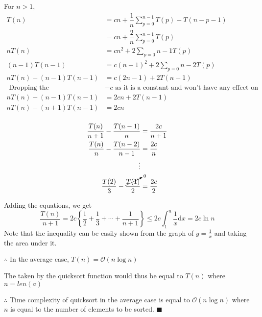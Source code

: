 \documentclass[answers]{exam}
\renewcommand{\O}[1]{\mathcal{O}\left(#1\right)}
\begin{document}
\begin{questions}
\begin{solution}
            For \(n > 1\),
            \begin{equation*}
                \begin{aligned}
                    T(n) &= cn + \dfrac{1}{n}\sum_{p=0}^{n-1}{T(p) + T(n - p - 1)} \\
                         &= cn + \dfrac{2}{n}\sum_{p=0}^{n-1}{T(p)} \\    
                    nT(n) &= cn^2 + 2\sum_{p=0}{n - 1}{T(p)} \\
                    (n - 1)T(n - 1) &= c(n - 1)^2 + 2\sum_{p=0}{n - 2}{T(p)} \\
                    nT(n) - (n-1)T(n-1) &= c(2n - 1) + 2T(n - 1) \\
                    \text{ Dropping the } &-c \text{ as it is a constant and won't have any effect on the order} \\   
                    nT(n) - (n-1)T(n-1) &= 2cn + 2T(n - 1) \\
                    nT(n) - (n + 1)T(n - 1) &= 2cn \\
                \end{aligned}
            \end{equation*}

            \begin{equation*}
                \begin{aligned}
                    \frac{T(n)}{n+1} - \frac{T(n-1)}{n} &= \frac{2c}{n + 1} \\
                    \frac{T(n)}{n} - \frac{T(n-2)}{n-1} &= \frac{2c}{n} \\
                    \vdots \\
                    \frac{T(2)}{3} - \frac{\cancelto{0}{T(1)}}{2} &= \frac{2c}{2} \\
                \end{aligned}
            \end{equation*}

            Adding the equations, we get
            \[\frac{T(n)}{n + 1} = 2c\left\{\frac{1}{2} + \frac{1}{3} + \cdots + \frac{1}{n + 1}\right\}
                \leq 2c\int_{1}^{n}{\frac{1}{x} \text{d}x} = 2c\ln{n}
            \]
            Note that the inequality can be easily shown from the graph of \(y = \frac{1}{x}\) and
            taking the area under it.

            \(\therefore\) In the average case, \(T(n) = \O{n \log{n}}\)

            The taken by the quicksort function would thus be equal to \(T(n)\)
            where \(n = len(a)\)

            \(\therefore\) Time complexity of quicksort in the average case is equal to
            \(\O{n \log n}\) where \(n\) is equal to the number of elements to be sorted.
            \(\blacksquare\)
        \end{solution}
    \end{questions}
\end{document}
